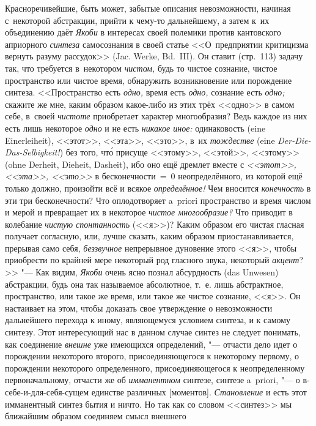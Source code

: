 Красноречивейшие, быть может, забытые описания невозможности, начиная
с~некоторой абстракции, прийти к чему-то дальнейшему, а затем к~их объединению
даёт {\em Якоби} в интересах своей полемики против кантовского априорного
{\em синтеза} самосознания в своей статье <<О~предприятии критицизма вернуть
разуму рассудок>> (Jac. Werke, Bd.~III). Он ставит (стр.~113) задачу так, что
требуется в~некотором {\em чистом,} будь то чистое сознание, чистое
пространство или чистое время, обнаружить возникновение или порождение синтеза.
<<Пространство есть {\em одно,} время есть {\em одно,} сознание есть
{\em одно;} скажите же мне, каким образом какое-либо из этих трёх <<одно>> в самом
себе, в~своей {\em чистоте} приобретает характер многообразия? Ведь
каждое из них есть лишь некоторое {\em одно} и не есть {\em никакое иное:}
одинаковость (eine Einer\-lei\-heit), <<этот>>, <<эта>>, <<это>>, в~их
{\em тождестве} (eine {\em Der-Die-Das-Selbigkeit!}) без того, чт\'{о} присуще
<<этому>>, <<этой>>, <<этому>> (ohne Derheit, Dieheit, Dasheit), ибо оно ещё
дремлет вместе с {\em <<этот>>, <<эта>>, <<это>>} в бесконечности~=~0
неопределённого, из которой ещё только должно, произойти всё и всякое
{\em определённое!} Чем вносится {\em конечность} в эти три бесконечности? Что
оплодотворяет a~priori пространство и время числом и мерой и превращает их в
некоторое {\em чистое многообразие?} Что приводит в колебание
{\em чистую спонтанность} (<<я>>)? Каким образом его чистая гласная получает согласную,
или, лучше сказать, каким образом приостанавливается, прерывая само себя,
{\em беззвучное} непрерывное дуновение этого <<я>>, чтобы приобрести по крайней мере
некоторый род гласного звука, некоторый {\em акцент}?>> "--- Как видим,
{\em Якоби} очень ясно познал абсурдность (das Unwesen) абстракции, будь она так
называемое абсолютное, т.~е. лишь абстрактное, пространство, или такое же
время, или такое же чистое сознание, <<я>>. Он настаивает на этом, чтобы
доказать свое утверждение о невозможности дальнейшего перехода к иному,
являющемуся условием синтеза, и к самому синтезу. Этот интересующий нас в
данном случае синтез не следует понимать, как соединение {\em внешне} уже
имеющихся определений, "--- отчасти дело идет о порождении некоторого второго,
присоединяющегося к некоторому первому, о порождении некоторого определенного,
присоединяющегося к неопределенному первоначальному, отчасти же об {\em
имманентном} синтезе, синтезе a~priori, "--- о в-себе-и-для-себя-сущем единстве
различных [моментов]. {\em Становление} и есть этот имманентный синтез бытия и ничто. Но
так как со словом <<синтез>> мы ближайшим образом соединяем смысл внешнего
